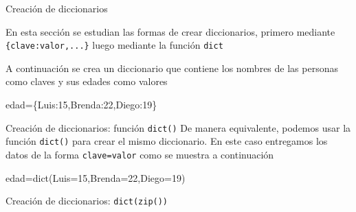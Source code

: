 \documentclass[
  ignorenonframetext,
  aspectratio=169,
  spanish,
]{beamer}
\newenvironment{Shaded}{\begin{snugshade}}{\end{snugshade}}
\newcommand{\BuiltInTok}[1]{\textcolor[rgb]{0.00,0.23,0.31}{#1}}
\newcommand{\DecValTok}[1]{\textcolor[rgb]{0.68,0.00,0.00}{#1}}
\newcommand{\NormalTok}[1]{\textcolor[rgb]{0.00,0.23,0.31}{#1}}
\newcommand{\OperatorTok}[1]{\textcolor[rgb]{0.37,0.37,0.37}{#1}}
\newcommand{\StringTok}[1]{\textcolor[rgb]{0.13,0.47,0.30}{#1}}
\begin{document}
\begin{frame}[fragile]{Creación de diccionarios}
\label{sec-crearciondiccionarios}
 

En esta sección se estudian las formas de crear diccionarios, primero
mediante \texttt{\{clave:valor,...\}} luego mediante la función
\texttt{dict}

A continuación se crea un diccionario que contiene los nombres de las
personas como claves y sus edades como valores

\begin{Shaded}
\begin{Highlighting}[]
\NormalTok{edad}\OperatorTok{=}\NormalTok{\{}\StringTok{\textquotesingle{}Luis\textquotesingle{}}\NormalTok{:}\DecValTok{15}\NormalTok{,}\StringTok{\textquotesingle{}Brenda\textquotesingle{}}\NormalTok{:}\DecValTok{22}\NormalTok{,}\StringTok{\textquotesingle{}Diego\textquotesingle{}}\NormalTok{:}\DecValTok{19}\NormalTok{\}}
\end{Highlighting}
\end{Shaded}


\begin{block}{Creación de diccionarios: función \texttt{dict()}}
\label{creaciuxf3n-de-diccionarios-funciuxf3n-dict}
De manera equivalente, podemos usar la función \texttt{dict()} para
crear el mismo diccionario. En este caso entregamos los datos de la
forma \texttt{clave=valor} como se muestra a continuación

\begin{Shaded}
\begin{Highlighting}[]
\NormalTok{edad}\OperatorTok{=}\BuiltInTok{dict}\NormalTok{(Luis}\OperatorTok{=}\DecValTok{15}\NormalTok{,Brenda}\OperatorTok{=}\DecValTok{22}\NormalTok{,Diego}\OperatorTok{=}\DecValTok{19}\NormalTok{) }
\end{Highlighting}
\end{Shaded}
\end{block}

\begin{block}{Creación de diccionarios: \texttt{dict(zip())}}
\label{creaciuxf3n-de-diccionarios-dictzip}


\end{block}
\end{frame}
\end{document}

